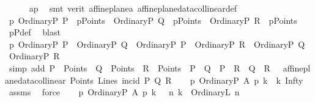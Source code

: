 \begin{isabellebody}
\ \ \ \ \isamarkupfalse%
\ ap\ \isamarkupfalse%
\ {\isacharparenleft}{\kern0pt}smt\ {\isacharparenleft}{\kern0pt}verit{\isacharparenright}{\kern0pt}\ affine{\isacharunderscore}{\kern0pt}plane{\isachardot}{\kern0pt}a{}\ affine{\isacharunderscore}{\kern0pt}plane{\isacharunderscore}{\kern0pt}data{\isachardot}{\kern0pt}collinear{\isacharunderscore}{\kern0pt}def{\isacharparenright}{\kern0pt}\isanewline
\ \ \isamarkupfalse%
\ \isamarkupfalse%
\ p{}{\isacharcolon}{\kern0pt}\ {\isachardoublequoteopen}OrdinaryP\ P\ {\isasymin}\ pPoints\ {\isasymand}\ OrdinaryP\ Q\ {\isasymin}\ pPoints\ {\isasymand}\ OrdinaryP\ R\ {\isasymin}\ pPoints{\isachardoublequoteclose}\ \isamarkupfalse%
\ pPdef\ \isamarkupfalse%
\ blast\isanewline
\ \ \isamarkupfalse%
\ p{}{\isacharcolon}{\kern0pt}\ {\isachardoublequoteopen}{\isacharparenleft}{\kern0pt}OrdinaryP\ P\ {\isasymnoteq}\ OrdinaryP\ Q{\isacharparenright}{\kern0pt}\ {\isasymand}\ {\isacharparenleft}{\kern0pt}OrdinaryP\ P\ {\isasymnoteq}\ OrdinaryP\ R{\isacharparenright}{\kern0pt}\ {\isasymand}\ {\isacharparenleft}{\kern0pt}OrdinaryP\ Q\ {\isasymnoteq}\ OrdinaryP\ R{\isacharparenright}{\kern0pt}{\isachardoublequoteclose}\isanewline
\ \ \ \ \isamarkupfalse%
\ {\isacharparenleft}{\kern0pt}simp\ add{\isacharcolon}{\kern0pt}\ {\isacartoucheopen}P\ {\isasymin}\ Points\ {\isasymand}\ Q\ {\isasymin}\ Points\ {\isasymand}\ R\ {\isasymin}\ Points\ {\isasymand}\ P\ {\isasymnoteq}\ Q\ {\isasymand}\ P\ {\isasymnoteq}\ R\ {\isasymand}\ Q\ {\isasymnoteq}\ R\ {\isasymand}\ {\isasymnot}\ affine{\isacharunderscore}{\kern0pt}plane{\isacharunderscore}{\kern0pt}data{\isachardot}{\kern0pt}collinear\ Points\ Lines\ incid\ P\ Q\ R{\isacartoucheclose}{\isacharparenright}{\kern0pt}\isanewline
\ \ \isamarkupfalse%
\ p{}{\isacharcolon}{\kern0pt}\ {\isachardoublequoteopen}{\isacharparenleft}{\kern0pt}{\isacharparenleft}{\kern0pt}OrdinaryP\ A{\isacharparenright}{\kern0pt}\ p{\isasymlhd}\ k{\isacharparenright}{\kern0pt}\ {\isasymLongrightarrow}\ k\ {\isasymnoteq}Infty{\isachardoublequoteclose}\ \isamarkupfalse%
\ assms{\isacharparenleft}{\kern0pt}{}{\isacharparenright}{\kern0pt}\ \isamarkupfalse%
\ force\isanewline
\ \ \isamarkupfalse%
\ p{}{\isacharcolon}{\kern0pt}\ {\isachardoublequoteopen}{\isacharparenleft}{\kern0pt}{\isacharparenleft}{\kern0pt}OrdinaryP\ A{\isacharparenright}{\kern0pt}\ p{\isasymlhd}\ k{\isacharparenright}{\kern0pt}\ {\isasymLongrightarrow}\ {\isacharparenleft}{\kern0pt}{\isasymexists}\ n{\isachardot}{\kern0pt}\ k\ {\isacharequal}{\kern0pt}\ OrdinaryL\ n{\isacharparenright}{\kern0pt}{\isachardoublequoteclose}\ \isamarkupfalse%

\end{isabellebody}
